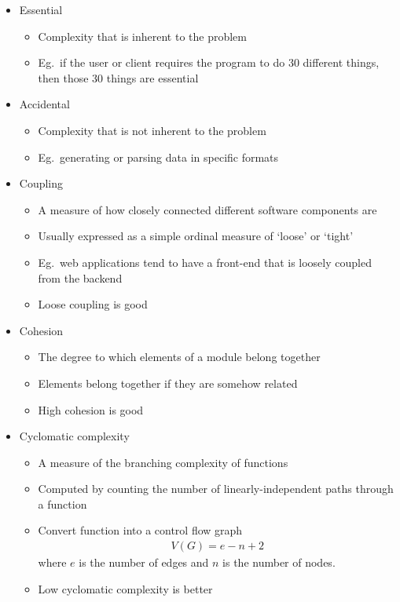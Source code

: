 \documentclass{report}
\begin{document}
	\begin{itemize}
		\item Essential
			\begin{itemize}
				\item Complexity that is inherent to the problem
				\item Eg.\ if the user or client requires the program to do 30 different things, then those 30 things are essential
			\end{itemize}
		\item Accidental
			\begin{itemize}
				\item Complexity that is not inherent to the problem
				\item Eg.\ generating or parsing data in specific formats
			\end{itemize}
		\item Coupling
			\begin{itemize}
				\item A measure of how closely connected different software components are
				\item Usually expressed as a simple ordinal measure of `loose' or `tight'
				\item Eg.\ web applications tend to have a front-end that is loosely coupled from the backend
				\item Loose coupling is good
			\end{itemize}
		\item Cohesion
			\begin{itemize}
				\item The degree to which elements of a module belong together
				\item Elements belong together if they are somehow related
				\item High cohesion is good
			\end{itemize}
		\item Cyclomatic complexity
			\begin{itemize}
				\item A measure of the branching complexity of functions
				\item Computed by counting the number of linearly-independent paths through a function
				\item Convert function into a control flow graph
					\begin{align*}
						V(G) = e - n + 2
					\end{align*}
					where $e$ is the number of edges and $n$ is the number of nodes.
				\item Low cyclomatic complexity is better
			\end{itemize}
	\end{itemize}
\end{document}
